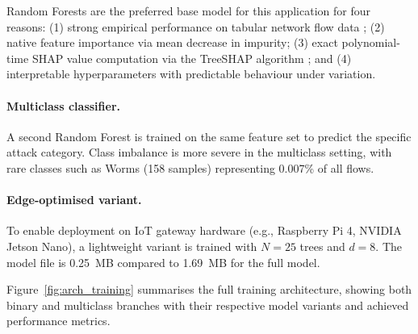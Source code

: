 \documentclass[12pt,a4paper]{article}
\begin{document}
Random Forests are the preferred base model for this application for four reasons:
(1) strong empirical performance on tabular network flow data
\cite{buczak2016survey}; (2) native feature importance via mean decrease in
impurity; (3) exact polynomial-time SHAP value computation via the TreeSHAP
algorithm \cite{lundberg2017shap}; and (4) interpretable hyperparameters with
predictable behaviour under variation.

\paragraph{Multiclass classifier.}
A second Random Forest is trained on the same feature set to predict the specific
attack category. Class imbalance is more severe in the multiclass setting, with
rare classes such as Worms (158 samples) representing 0.007\% of all flows.

\paragraph{Edge-optimised variant.}
To enable deployment on IoT gateway hardware (e.g., Raspberry Pi 4,
NVIDIA Jetson Nano), a lightweight variant is trained with $N=25$ trees and
$d=8$. The model file is 0.25~MB compared to 1.69~MB for the full model.

Figure~\ref{fig:arch_training} summarises the full training architecture,
showing both binary and multiclass branches with their respective model variants
and achieved performance metrics.
\end{document}
